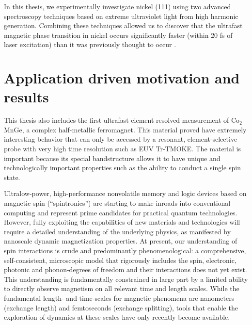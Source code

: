 In this thesis, we experimentally investigate nickel (111) using two advanced spectroscopy techniques based on extreme ultraviolet light from high harmonic generation. Combining these techniques allowed us to discover that the ultrafast magnetic phase transition in nickel occurs significantly faster (within 20 fs of laser excitation) than it was previously thought to occur \cite{Tengdin2018}.

\section{Application driven motivation and results}

This thesis also includes the first ultrafast element resolved measurement of Co$_2$MnGe, a complex half-metallic ferromagnet. This material proved have extremely interesting behavior that can only be accessed by a resonant, element-selective probe with very high time resolution such as EUV Tr-TMOKE. The material is important because its special bandstructure allows it to have unique and technologically important properties such as the ability to conduct a single spin state.

Ultralow-power, high-performance nonvolatile memory and logic devices based on magnetic spin (“spintronics”) are starting to make inroads into conventional computing and represent prime candidates for practical quantum technologies. However, fully exploiting the capabilities of new materials and technologies will require a detailed understanding of the underlying physics, as manifested by nanoscale dynamic magnetization properties. At present, our understanding of spin interactions is crude and predominantly phenomenological: a comprehensive, self-consistent, microscopic model that rigorously includes the spin, electronic, photonic and phonon-degrees of freedom and their interactions does not yet exist. This understanding is fundamentally constrained in large part by a limited ability to directly observe magnetism on all relevant time and length scales. While the fundamental length- and time-scales for magnetic phenomena are nanometers (exchange length) and femtoseconds (exchange splitting), tools that enable the exploration of dynamics at these scales have only recently become available. 

